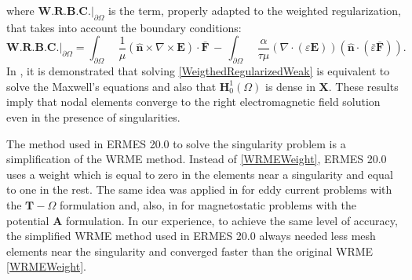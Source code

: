 where $\textbf{W.R.B.C.}|_{\partial\Omega}$ is the term, properly adapted to the weighted regularization, that takes into account the boundary conditions: 
\begin{equation}\label{RBCGeneral-WRWF}
	\textbf{W.R.B.C.}|_{\partial\Omega} = \int_{\partial\Omega}\enspace\frac{1}{\mu}\left(\mathbf{\hat{n}}\times\nabla\times\mathbf{E}\right)\cdot\mathbf{\bar{F}}\, - \,\int_{\partial\Omega}\enspace\frac{\alpha}{\tau\mu}\left(\nabla\cdot\left(\varepsilon\mathbf{E}\right)\right)\left(\mathbf{\hat{n}}\cdot\left(\bar{\varepsilon}\mathbf{\bar{F}}\right)\right).
\end{equation}
In \cite{WeightedRegularizedME}, it is demonstrated that solving \eqref{WeigthedRegularizedWeak} is equivalent to solve the Maxwell's equations and also that $\mathbf{H}^{1}_{0}(\Omega)$ is dense in $\mathbf{X}$. These results imply that nodal elements converge to the right electromagnetic field solution even in the presence of singularities.

The method used in ERMES 20.0 to solve the singularity problem is a simplification of the WRME method. Instead of \eqref{WRMEWeight}, ERMES 20.0 uses a weight which is equal to zero in the elements near a singularity and equal to one in the rest. The same idea was applied in \cite{CeroGaugeInCorners} for eddy current problems with the $\mathbf{T}-\Omega$ formulation and, also, in \cite{CeroDivInCorners} for magnetostatic problems with the potential \textbf{A} formulation. In our experience, to achieve the same level of accuracy, the simplified WRME method used in ERMES 20.0 always needed less mesh elements near the singularity and converged faster than the original WRME \eqref{WRMEWeight}.

